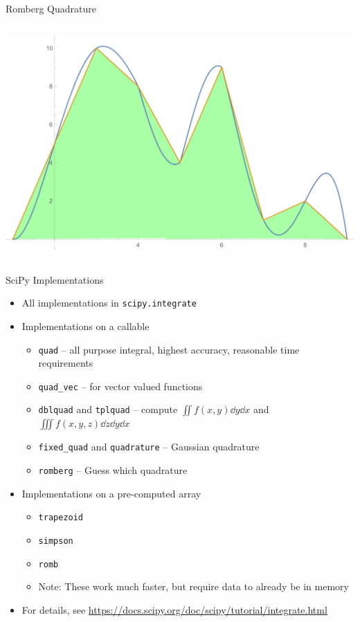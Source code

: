 \begin{frame}{Romberg Quadrature}
\begin{columns}
\includegraphics[width=\linewidth]{./gfx/06-romberg-03}
\end{columns}
%
\end{frame}


\begin{frame}{SciPy Implementations}
%
\begin{itemize}
\item All implementations in \texttt{scipy.integrate}
\item Implementations on a callable
	\begin{itemize}
	\item \texttt{quad} -- all purpose integral, highest accuracy, reasonable time requirements
	\item \texttt{quad\_vec} -- for vector valued functions
	\item \texttt{dblquad} and \texttt{tplquad} -- compute $\iint f(x, y) \dd{y}\dd{x}$ and $\iiint f(x, y, z) \dd{z}\dd{y}\dd{x}$
	\item \texttt{fixed\_quad} and \texttt{quadrature} -- Gaussian quadrature
	\item \texttt{romberg} -- Guess which quadrature
	\end{itemize}
\item Implementations on a pre-computed array
	\begin{itemize}
	\item \texttt{trapezoid}
	\item \texttt{simpson}
	\item \texttt{romb}
	\item Note: These work much faster, but require data to already be in memory
	\end{itemize}
\item For details, see \url{https://docs.scipy.org/doc/scipy/tutorial/integrate.html} 
\end{itemize}
%
\end{frame}

